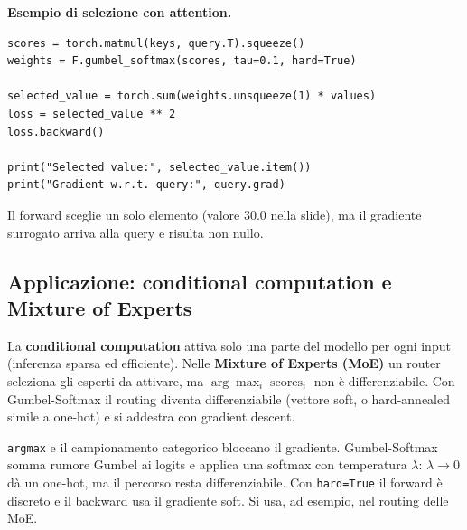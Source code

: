 \documentclass[11pt,a4paper]{article}
\begin{document}
\textbf{Esempio di selezione con attention.}
\begin{lstlisting}
scores = torch.matmul(keys, query.T).squeeze()
weights = F.gumbel_softmax(scores, tau=0.1, hard=True)

selected_value = torch.sum(weights.unsqueeze(1) * values)
loss = selected_value ** 2
loss.backward()

print("Selected value:", selected_value.item())
print("Gradient w.r.t. query:", query.grad)
\end{lstlisting}
Il forward sceglie un solo elemento (valore $30.0$ nella slide), ma il gradiente surrogato arriva alla query e risulta non nullo.

\subsection{Applicazione: conditional computation e Mixture of Experts}
La \textbf{conditional computation} attiva solo una parte del modello per ogni input (inferenza sparsa ed efficiente).
Nelle \textbf{Mixture of Experts (MoE)} un router seleziona gli esperti da attivare, ma $\arg\max_i\operatorname{scores}_i$ non è differenziabile.
Con Gumbel-Softmax il routing diventa differenziabile (vettore soft, o hard-annealed simile a one-hot) e si addestra con gradient descent.

\begin{importante}
\texttt{argmax} e il campionamento categorico bloccano il gradiente. Gumbel-Softmax somma rumore Gumbel ai logits e applica una softmax
con temperatura $\lambda$: $\lambda\to0$ dà un one-hot, ma il percorso resta differenziabile. Con \texttt{hard=True} il forward è discreto e il backward usa il gradiente soft.
Si usa, ad esempio, nel routing delle MoE.
\end{importante}
\end{document}

